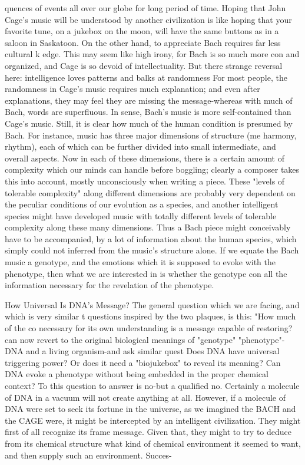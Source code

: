 quences of events all over our globe for long period of time. Hoping that John Cage's
music will be understood by another civilization is like hoping that your favorite tune, on
a jukebox on the moon, will have the same buttons as in a saloon in Saskatoon.
        On the other hand, to appreciate Bach requires far less cultural k edge. This may
seem like high irony, for Bach is so much more con and organized, and Cage is so devoid
of intellectuality. But there strange reversal here: intelligence loves patterns and balks at
randomness For most people, the randomness in Cage's music requires much explanation;
and even after explanations, they may feel they are missing the message-whereas with
much of Bach, words are superfluous. In sense, Bach's music is more self-contained than
Cage's music. Still, it is clear how much of the human condition is presumed by Bach.
        For instance, music has three major dimensions of structure (me harmony,
rhythm), each of which can be further divided into small intermediate, and overall
aspects. Now in each of these dimensions, there is a certain amount of complexity which
our minds can handle before boggling; clearly a composer takes this into account, mostly
unconsciously when writing a piece. These "levels of tolerable complexity" along
different dimensions are probably very dependent on the peculiar conditions of our
evolution as a species, and another intelligent species might have developed music with
totally different levels of tolerable complexity along these many dimensions. Thus a Bach
piece might conceivably have to be accompanied, by a lot of information about the
human species, which simply could not inferred from the music's structure alone. If we
equate the Bach music a genotype, and the emotions which it is supposed to evoke with
the phenotype, then what we are interested in is whether the genotype con all the
information necessary for the revelation of the phenotype.

How Universal Is DNA's Message?
The general question which we are facing, and which is very similar t questions inspired
by the two plaques, is this: "How much of the co necessary for its own understanding is a
message capable of restoring? can now revert to the original biological meanings of
"genotype" "phenotype"-DNA and a living organism-and ask similar quest Does DNA
have universal triggering power? Or does it need a "biojukebox" to reveal its meaning?
Can DNA evoke a phenotype without being embedded in the proper chemical context?
To this question to answer is no-but a qualified no. Certainly a molecule of DNA in a
vacuum will not create anything at all. However, if a molecule of DNA were set to seek
its fortune in the universe, as we imagined the BACH and the CAGE were, it might be
intercepted by an intelligent civilization. They might first of all recognize its frame
message. Given that, they might to try to deduce from its chemical structure what kind of
chemical environment it seemed to want, and then supply such an environment. Succes-




